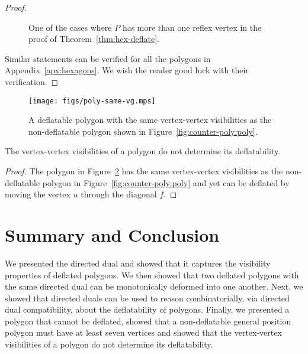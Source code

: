 \documentclass[11pt]{amsart}
\begin{document}
\begin{proof}
  \begin{figure}[htb]
    \centering
    \quad
    \caption{One of the cases where $P$ has more than one reflex
      vertex in the proof of Theorem~\ref{thm:hex-deflate}.}
    \label{fig:hexdef-example}
  \end{figure}

  Similar statements can be verified for all the polygons in
  Appendix~\ref{apx:hexagons}.  We wish the reader good luck with
  their verification.
\end{proof}



\begin{figure}[htb]
  \centering
  \texttt{[image: figs/poly-same-vg.mps]}
  \caption{A deflatable polygon with the same vertex-vertex
    visibilities as the non-deflatable polygon shown in
    Figure~\ref{fig:counter-poly:poly}.}
  \label{fig:def-poly-same-vis}
\end{figure}

\begin{theorem}
  The vertex-vertex visibilities of a polygon do not determine its
  deflatability.
\end{theorem}
\begin{proof}
  The polygon in Figure~\ref{fig:def-poly-same-vis} has the same
  vertex-vertex visibilities as the non-deflatable polygon in
  Figure~\ref{fig:counter-poly:poly} and yet can be deflated by moving
  the vertex $u$ through the diagonal $f$.
\end{proof}


\section{Summary and Conclusion}

We presented the directed dual and showed that it captures the
visibility properties of deflated polygons.  We then showed that two
deflated polygons with the same directed dual can be monotonically
deformed into one another.  Next, we showed that directed duals can be
used to reason combinatorially, via directed dual compatibility, about
the deflatability of polygons.  Finally, we presented a polygon that
cannot be deflated, showed that a non-deflatable
general position polygon must have at least seven vertices and
showed that the vertex-vertex visibilities of a polygon do not
determine its deflatability.
\end{document}
